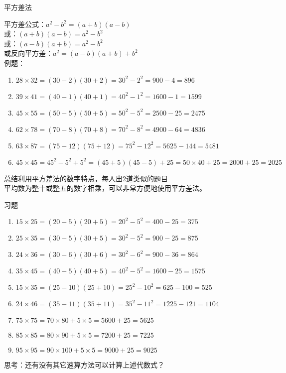 \documentclass[aspectratio=169]{ctexbeamer} %
\date{\today}
\begin{document}
\begin{frame}[t]{平方差法}
\begin{spacing}{1.2}
\normalsize
平方差公式：$a^2 - b^2 = (a+b)(a-b)$ \\
或：$(a+b)(a-b)=a^2 - b^2$ \\
或：$(a-b)(a+b)=a^2 - b^2$ \\
或反向平方差：$a^2 = (a-b)(a+b) + b^2$ \\
例题：
\begin{enumerate}[label={\arabic*.}]
\item $28 \times 32  = (30-2)(30+2)=30^2-2^2=900-4=896$
\item $39 \times 41  = (40-1)(40+1)=40^2-1^2=1600-1=1599$
\item $45 \times 55  = (50-5)(50+5)=50^2-5^2=2500-25=2475$
\item $62 \times 78  = (70-8)(70+8)=70^2-8^2=4900-64=4836$
\item $63 \times 87  = (75-12)(75+12)=75^2-12^2=5625-144=5481$
\item $45 \times 45  = 45^2 - 5^2 + 5^2 = (45+5)(45-5) + 25 =50 \times 40 + 25=2000 + 25 = 2025$
\end{enumerate}
\alert{总结利用平方差法的数字特点，每人出2道类似的题目} \\

平均数为整十或整五的数字相乘，可以非常方便地使用平方差法。
\end{spacing}
\end{frame}

\begin{frame}[t]{习题}
\begin{spacing}{1.2}
\normalsize
\begin{enumerate}[label={\arabic*.}]
\item $15 \times 25 =  (20-5)(20+5) = 20^2-5^2 = 400-25 = 375$
\item $25 \times 35 =  (30-5)(30+5) = 30^2-5^2 = 900-25 = 875$
\item $24 \times 36 =  (30-6)(30+6) = 30^2-6^2 = 900-36 = 864$
\item $35 \times 45 =  (40-5)(40+5) = 40^2-5^2 = 1600-25 = 1575$
\item $15 \times 35 =  (25-10)(25+10) = 25^2-10^2 = 625-100 = 525$
\item $24 \times 46 =  (35-11)(35+11) = 35^2-11^2 = 1225-121 = 1104$
\item $75 \times 75 =  70 \times 80 + 5 \times 5 = 5600 + 25 = 5625$
\item $85 \times 85 =  80 \times 90 + 5 \times 5 = 7200 + 25 = 7225$
\item $95 \times 95 =  90 \times 100 + 5 \times 5 = 9000 + 25 = 9025$
\end{enumerate}
\alert{思考：还有没有其它速算方法可以计算上述代数式？}
\end{spacing}
\end{frame}
\end{document}
